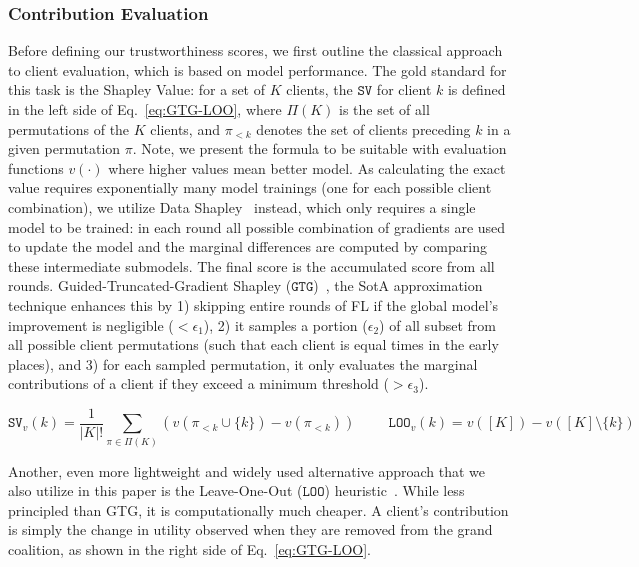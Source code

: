 \documentclass[acmsmall]{acmart}
\begin{document}
\subsubsection*{Contribution Evaluation}

Before defining our trustworthiness scores, we first outline the classical approach to client evaluation, which is based on model performance. The gold standard for this task is the Shapley Value: for a set of $K$ clients, the $\mathtt{SV}$ for client $k$ is defined in the left side of Eq.~\eqref{eq:GTG-LOO}, where $\Pi(K)$ is the set of all permutations of the $K$ clients, and $\pi_{<k}$ denotes the set of clients preceding $k$ in a given permutation $\pi$. Note, we present the formula to be suitable with evaluation functions $v(\cdot)$ where higher values mean better model. As calculating the exact value requires exponentially many model trainings (one for each possible client combination), we utilize Data Shapley~\cite{ghorbani2019data} instead, which only requires a single model to be trained: in each round all possible combination of gradients are used to update the model and the marginal differences are computed by comparing these intermediate submodels. The final score is the accumulated score from all rounds. Guided-Truncated-Gradient Shapley ($\mathtt{GTG}$)~\cite{liu2022gtg}, the SotA approximation technique enhances this by 1) skipping entire rounds of FL if the global model's improvement is negligible ($<\epsilon_1$), 2) it samples a portion ($\epsilon_2$) of all subset from all possible client permutations (such that each client is equal times in the early places), and 3) for each sampled permutation, it only evaluates the marginal contributions of a client if they exceed a minimum threshold ($>\epsilon_3$). 

\begin{equation}
    \label{eq:GTG-LOO}
    \mathtt{SV}_v(k) = \frac{1}{|K|!} \sum_{\pi \in \Pi(K)} \left( v(\pi_{<k} \cup \{k\}) - v(\pi_{<k}) \right)
    \hspace{1cm}
    \mathtt{LOO}_v(k) = v([K]) - v([K]\setminus\{k\})
\end{equation}

Another, even more lightweight and widely used alternative approach that we also utilize in this paper is the Leave-One-Out ($\mathtt{LOO}$) heuristic~\cite{evgeniou2004leave}. While less principled than GTG, it is computationally much cheaper. A client's contribution is simply the change in utility observed when they are removed from the grand coalition, as shown in the right side of Eq.~\eqref{eq:GTG-LOO}. 
\end{document}
